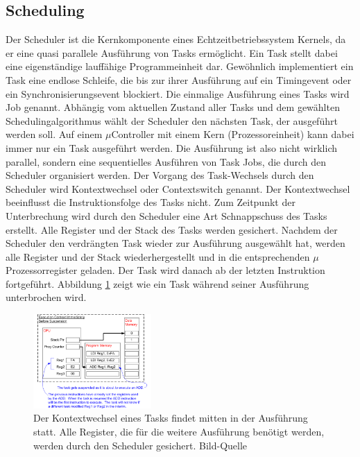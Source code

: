 \subsection{Scheduling}
\label{Scheduling}
Der Scheduler ist die Kernkomponente eines Echtzeitbetriebssystem Kernels, da er eine quasi parallele Aus\-füh\-rung von Tasks ermöglicht. Ein Task stellt dabei eine ei\-gen\-stän\-di\-ge lauffähige Programmeinheit dar. Gewöhnlich implementiert ein Task eine endlose Schleife, die bis zur ihrer Ausführung auf ein Timingevent oder ein Synchronisierungsevent blockiert. Die einmalige Aus\-füh\-rung eines Tasks wird Job\cite{9780128015070} genannt. 
Abhängig vom aktuellen Zustand aller Tasks und dem gewählten Scheduling\-algorithmus wählt der Scheduler den nächsten Task, der ausgeführt werden soll. Auf einem $\mu$Controller mit einem Kern (Prozessoreinheit) kann dabei immer nur ein Task ausgeführt werden. Die Ausführung ist also nicht wirklich parallel, sondern eine sequentielles Ausführen von Task Jobs, die durch den Scheduler organisiert werden. Der Vorgang des Task-Wechsels durch den Scheduler wird Kontextwechsel oder Contextswitch genannt. Der Kontextwechsel beeinflusst die Instruktionsfolge des Tasks nicht. Zum Zeitpunkt der Unterbrechung wird durch den Scheduler eine Art Schnappschuss des Tasks erstellt. Alle Register und der Stack des Tasks werden gesichert. Nachdem der Scheduler den verdrängten Task wieder zur Aus\-füh\-rung ausgewählt hat, werden alle Register und der Stack wiederhergestellt und in die entsprechenden $\mu$\-Pro\-zes\-sor\-re\-gis\-ter geladen. Der Task wird danach ab der letzten Instruktion fortgeführt. Abbildung \ref{fig:ContextSwitch} zeigt wie ein Task wäh\-rend seiner Ausführung unterbrochen wird.
\begin{figure}[ht!]
	\centering
		\includegraphics[width=0.4\textwidth]{Pictures/FreeRTOSOrg/ExeContext.png}
	\caption{Der Kontextwechsel eines Tasks findet mitten in der Aus\-füh\-rung statt. Alle Register, die für die weitere Ausführung benötigt werden, werden durch den Scheduler gesichert. Bild-Quelle~\protect{} }
	\label{fig:ContextSwitch}
\end{figure}
